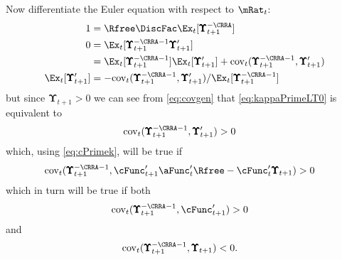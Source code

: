 \documentclass[./BufferStockTheory.tex]{subfiles}
\begin{document}
Now differentiate the Euler equation with respect to $\mRat_{t}$:
\begin{equation}\begin{gathered}\begin{aligned}
  1  & = \Rfree \DiscFac \Ex_{t}[ \pmb{\Upsilon}_{t+1}^{-\CRRA}] \notag
\\ 0  & = \Ex_{t}[\pmb{\Upsilon}_{t+1}^{-\CRRA-1} \pmb{\Upsilon}_{t+1}^{\prime}] \notag
\\  & = \Ex_{t}[\pmb{\Upsilon}_{t+1}^{-\CRRA-1}]\Ex_{t}[\pmb{\Upsilon}_{t+1}^{\prime}]+\mbox{cov}_{t}(\pmb{\Upsilon}_{t+1}^{-\CRRA-1},\pmb{\Upsilon}_{t+1}^{\prime}) \notag
\\ \Ex_{t}[\pmb{\Upsilon}_{t+1}^{\prime}]  & = -\mbox{cov}_{t}(\pmb{\Upsilon}_{t+1}^{-\CRRA-1},\pmb{\Upsilon}_{t+1}^{\prime})/\Ex_{t}[\pmb{\Upsilon}_{t+1}^{-\CRRA-1}] \label{eq:covgen}
\end{aligned}\end{gathered}\end{equation}
but since $\pmb{\Upsilon}_{t+1} > 0$ we can see from \eqref{eq:covgen} that \eqref{eq:kappaPrimeLT0} is equivalent to
\begin{equation}\begin{gathered}\begin{aligned}
 \mbox{cov}_{t}(\pmb{\Upsilon}_{t+1}^{-\CRRA-1},\pmb{\Upsilon}_{t+1}^{\prime})  & > 0 \nonumber
\end{aligned}\end{gathered}\end{equation}
which, using \eqref{eq:cPrimek}, will be true if
\begin{equation}\begin{gathered}\begin{aligned}
 \mbox{cov}_{t}(\pmb{\Upsilon}_{t+1}^{-\CRRA-1},\cFunc^{\prime}_{t+1}\aFunc^{\prime}_{t}\Rfree - \cFunc^{\prime}_{t}\pmb{\Upsilon}_{t+1})  & > 0 \notag
\end{aligned}\end{gathered}\end{equation}
which in turn will be true if both
\begin{equation}\begin{gathered}\begin{aligned}
  \mbox{cov}_{t}(\pmb{\Upsilon}_{t+1}^{-\CRRA-1},\cFunc^{\prime}_{t+1} )  & > 0 \notag
\end{aligned}\end{gathered}\end{equation}
and
\begin{align*}
  \mbox{cov}_{t}(\pmb{\Upsilon}_{t+1}^{-\CRRA-1},\pmb{\Upsilon}_{t+1})  & < 0. \notag
\end{align*}
\end{document}
